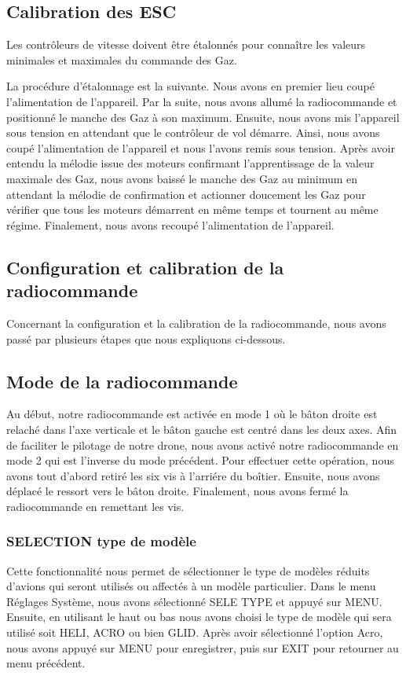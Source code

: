	\subsection{Calibration des ESC}
	Les contrôleurs de vitesse doivent être étalonnés pour connaître les valeurs minimales et maximales du commande des Gaz. 
	
	
	La procédure d’étalonnage est la suivante. Nous avons en premier lieu coupé l’alimentation de l’appareil. Par la suite, nous avons allumé la radiocommande et positionné le manche des Gaz à son maximum. Ensuite, nous avons mis l’appareil sous tension en attendant que le contrôleur de vol démarre. Ainsi, nous avons coupé l’alimentation de l’appareil et nous l'avons remis sous tension. Après avoir entendu la mélodie issue des moteurs confirmant l’apprentissage de la valeur maximale des Gaz, nous avons baissé le manche des Gaz au minimum en attendant la mélodie de confirmation et actionner doucement les Gaz pour vérifier que tous les moteurs démarrent en même temps et tournent au même régime. Finalement, nous avons recoupé l’alimentation de l’appareil.
	\subsection{Configuration et calibration de la radiocommande}
	Concernant la configuration et la calibration de la radiocommande, nous avons passé par plusieurs étapes que nous expliquons ci-dessous. 
	\subsection{Mode de la radiocommande}
	Au début, notre radiocommande est activée en mode 1 où le bâton droite est relaché dans l'axe verticale et le bâton gauche est centré dans les deux axes. Afin de faciliter le pilotage de notre drone, nous avons activé notre radiocommande en mode 2  qui est l'inverse du mode précédent. Pour effectuer cette opération, nous avons tout d'abord retiré les six vis à l'arriére du boîtier. Ensuite, nous avons déplacé le ressort vers le bâton droite.  Finalement, nous avons fermé la radiocommande en remettant les vis.
	
	
	\subsubsection{SELECTION type de modèle}
	Cette fonctionnalité nous permet de sélectionner le type de modèles réduits d'avions qui seront utilisés ou affectés à un modèle particulier.
	Dans le menu Réglages Système, nous avons sélectionné SELE TYPE et appuyé sur MENU. Ensuite, en utilisant le haut ou bas nous avons choisi le type de modèle qui sera utilisé soit HELI, ACRO ou bien GLID. Après avoir sélectionné l'option Acro, nous avons appuyé sur MENU pour enregistrer, puis sur EXIT pour retourner au menu précédent.
	
